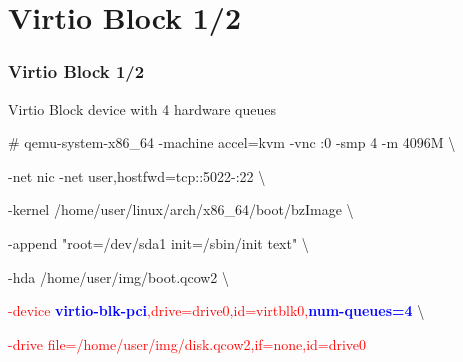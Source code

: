 \documentclass[aspectratio=169]{beamer}
\begin{document}
\section{Virtio Block 1/2}
\begin{frame}
\frametitle{Virtio Block 1/2}
{\LARGE Virtio Block device with 4 hardware queues}

\begin{block}{}

\# qemu-system-x86\_64 -machine accel=kvm -vnc :0 -smp 4 -m 4096M \textbackslash

-net nic -net user,hostfwd=tcp::5022-:22 \textbackslash

-kernel /home/user/linux/arch/x86\_64/boot/bzImage \textbackslash
	
-append "root=/dev/sda1 init=/sbin/init text" \textbackslash

-hda /home/user/img/boot.qcow2 \textbackslash

\textcolor{red}{-device \textbf{\textcolor{blue}{virtio-blk-pci}},drive=drive0,id=virtblk0,\textbf{\textcolor{blue}{num-queues=4}}} \textbackslash

\textcolor{red}{-drive file=/home/user/img/disk.qcow2,if=none,id=drive0}

\end{block}
\end{frame}

\end{document}
